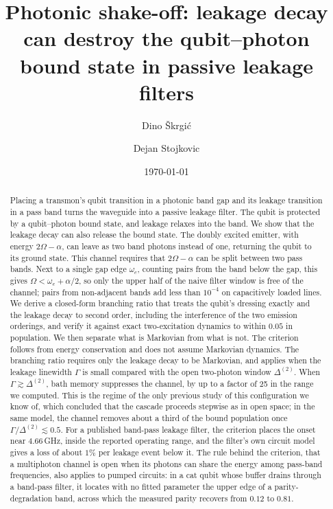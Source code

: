 \documentclass[aps,prresearch,twocolumn,superscriptaddress,nofootinbib,longbibliography,floatfix]{revtex4-2}
\begin{document}
\title{Photonic shake-off: leakage decay can destroy the qubit–photon bound state in passive leakage filters}

\author{Dino \v{S}krgi\'c}
\author{Dejan Stojkovic}

\date{\today}

\begin{abstract}
Placing a transmon's qubit transition in a photonic band gap and its leakage transition in a pass band turns the
waveguide into a passive leakage filter. The qubit is protected by a qubit--photon bound state, and leakage relaxes
into the band. We show that the leakage decay can also release the bound state. The doubly excited emitter, with
energy $2\Omega-\alpha$, can leave as two band photons instead of one, returning the qubit to its ground state. This
channel requires that $2\Omega-\alpha$ can be split between two pass bands. Next to a single gap edge $\omega_e$, counting
pairs from the band below the gap, this gives $\Omega<\omega_e+\alpha/2$, so only the upper half of the naive filter window is free of the channel;
pairs from non-adjacent bands add less than $10^{-4}$ on capacitively loaded lines. We derive a closed-form branching
ratio that treats the qubit's dressing exactly and the leakage decay to second order, including the interference of
the two emission orderings, and verify it against exact two-excitation dynamics to within $0.05$ in population. We
then separate what is Markovian from what is not. The criterion follows from energy conservation and does not assume
Markovian dynamics. The branching ratio requires only the leakage decay to be Markovian, and applies when the leakage
linewidth $\Gamma$ is small compared with the open two-photon window $\Delta^{(2)}$. When $\Gamma\gtrsim\Delta^{(2)}$,
bath memory suppresses the channel, by up to a factor of 25 in the range we computed. This is the regime of the only
previous study of this configuration we know of, which concluded that the cascade proceeds stepwise as in open space;
in the same model, the channel removes about a third of the bound population once $\Gamma/\Delta^{(2)}\lesssim0.5$.
For a published band-pass leakage filter, the criterion places the onset near $4.66$\,GHz, inside the reported
operating range, and the filter's own circuit model gives a loss of about $1\%$ per leakage event below it. The rule
behind the criterion, that a multiphoton channel is open when its photons can share the energy among pass-band
frequencies, also applies to pumped circuits: in a cat qubit whose buffer drains through a band-pass filter, it locates
with no fitted parameter the upper edge of a parity-degradation band, across which the measured parity recovers from
$0.12$ to $0.81$.
\end{abstract}
\end{document}
